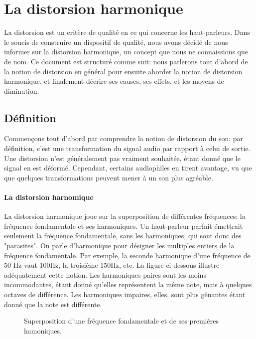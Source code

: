 

\section{La distorsion harmonique}

La distorsion est un critère de qualité en ce qui concerne les haut-parleurs.
Dans le soucis de construire un dispositif de qualité, nous avons décidé de 
nous informer sur la distorsion harmonique, un concept que nous ne connaissions
que de nom.
Ce document est structuré comme suit: nous parlerons tout d'abord de la notion  de distorsion 
en général pour ensuite aborder la notion  de distorsion 
harmonique, et finalement décrire ses causes, ses effets,
et les moyens de diminution.

\subsection{Définition}
Commençons tout d'abord par comprendre la notion de distorsion du son: par définition, c'est
une transformation du signal audio par rapport à celui de sortie. Une distorsion n'est généralement pas vraiment souhaitée, étant donné
que le signal en est déformé. Cependant, certains audiophiles en tirent avantage, vu que que quelques
transformations peuvent mener à un son plus agréable.

\paragraph{La distorsion harnomique}
La distorsion harmonique joue sur la superposition de différentes fréquences:
la fréquence fondamentale et ses harmoniques. Un haut-parleur parfait émettrait seulement la fréquence fondamentale, sans les harmoniques, qui sont donc des "parasites".
On parle d'harmonique pour désigner les multiples entiers de la fréquence fondamentale.
Par exemple, la seconde harmonique d'une fréquence de 50 Hz vaut 100Hz, la troisième 150Hz, etc. La figure 
ci-dessous illustre adéquatement cette notion.
Les harmoniques paires sont les moins incommodantes, étant donné qu'elles représentent la même note, mais à quelques octaves de différence.
Les harmoniques impaires, elles, sont plus gênantes étant donné que la note est différente.

\begin{figure}[ht!]
\centering
{}
\caption{Superposition d'une fréquence fondamentale et de ses premières hamoniques.}
\label{Superposition d'une fréquence fondamentale et de ses premières hamoniques.}
\end{figure}

